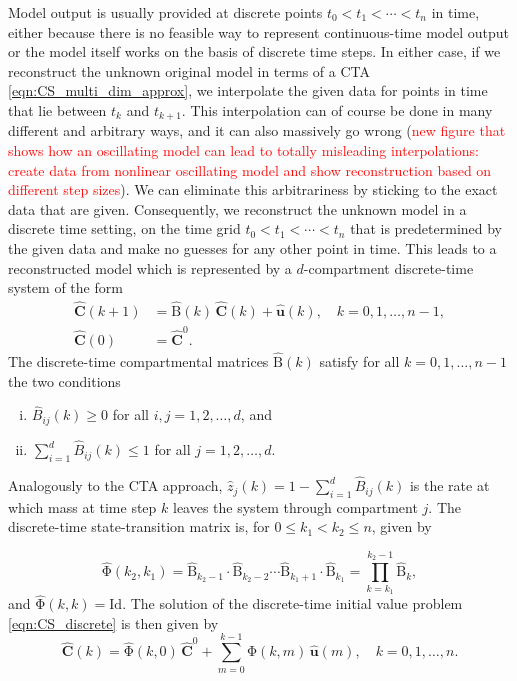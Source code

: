 \documentclass[11pt,a4paper]{article}
\newcommand{\red}[1]{\textcolor{red}{#1}}
\renewcommand{\vec}[1]{\mathbf{#1}}
\newcommand{\tens}[1]{\mathrm{#1}}
\newcommand{\id}{\tens{Id}}
\newcommand{\suml}{\sum\limits}
\begin{document}
    Model output is usually provided at discrete points $t_0<t_1<\cdots<t_n$ in time, either because there is no feasible way to represent continuous-time model output or the model itself works on the basis of discrete time steps.
    In either case, if we reconstruct the unknown original model in terms of a CTA \eqref{eqn:CS_multi_dim_approx}, we interpolate the given data for points in time that lie between $t_k$ and $t_{k+1}$.
    This interpolation can of course be done in many different and arbitrary ways, and it can also massively go wrong (\red{new figure that shows how an oscillating model can lead to totally misleading interpolations: create data from nonlinear oscillating model and show reconstruction based on different step sizes}).
    We can eliminate this arbitrariness by sticking to the exact data that are given.
    Consequently, we reconstruct the unknown model in a discrete time setting, on the time grid $t_0<t_1<\cdots<t_n$ that is predetermined by the given data and make no guesses for any other point in time.
    This leads to a reconstructed model which is represented by a $d$-compartment discrete-time system of the form
    \begin{equation}\label{eqn:CS_discrete}
        \begin{aligned}
            \widehat{\vec{C}}(k+1) &= \widehat{\tens{B}}(k)\,\widehat{\vec{C}}(k) + \widehat{\vec{u}}(k),\quad k=0,1,\ldots,n-1,\\
            \widehat{\vec{C}}(0) &= \widehat{\vec{C}}^0.
        \end{aligned}
    \end{equation}
    The discrete-time compartmental matrices $\widehat{\tens{B}}(k)$ satisfy for all $k=0,1,\ldots,n-1$ the two conditions
    \begin{enumerate}[(i)]
        \item $\widehat{B}_{ij}(k)\geq0$ for all $i,j=1,2,\ldots,d$, and
        \item $\suml_{i=1}^d \widehat{B}_{ij}(k)\leq 1$ for all $j=1,2,\ldots,d$.
    \end{enumerate}
    Analogously to the CTA approach, $\widehat{z}_j(k)=1-\sum_{i=1}^d \widehat{B}_{ij}(k)$ is the rate at which mass at time step $k$ leaves the system through compartment $j$.
    The discrete-time state-transition matrix is, for $0\leq k_1<k_2\leq n$, given by
    
    \begin{equation*}
        \widehat{\tens{\Phi}}(k_2,k_1) = \widehat{\tens{B}}_{k_2-1}\cdot\widehat{\tens{B}}_{k_2-2}\cdots\widehat{\tens{B}}_{k_1+1}\cdot\widehat{\tens{B}}_{k_1} = \prod\limits_{k=k_1}^{k_2-1}\widehat{\tens{B}}_k,
    \end{equation*}
    and $\widehat{\tens{\Phi}}(k,k)=\id$.
    The solution of the discrete-time initial value problem \eqref{eqn:CS_discrete} is then given by
    \begin{equation*}
        \widehat{\vec{C}}(k) = \widehat{\tens{\Phi}}(k,0)\,\widehat{\vec{C}}^0 + \suml_{m=0}^{k-1} \widehat{\tens{\Phi}}(k,m)\,\widehat{\vec{u}}(m),\quad k=0,1,\ldots,n.
    \end{equation*}
    
\end{document}
